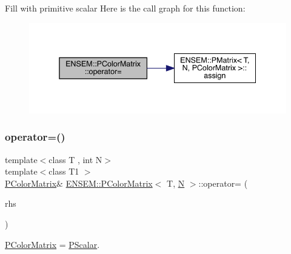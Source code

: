 Fill with primitive scalar Here is the call graph for this function\+:
\nopagebreak
\begin{figure}[H]
\begin{center}
\leavevmode
\includegraphics[width=338pt]{d8/d21/classENSEM_1_1PColorMatrix_a7750e72b224e47b6a559f3dc112b72d3_cgraph}
\end{center}
\end{figure}
\mbox{\label{classENSEM_1_1PColorMatrix_a7750e72b224e47b6a559f3dc112b72d3}} 
\subsubsection{\texorpdfstring{operator=()}{operator=()}\hspace{0.1cm}{\footnotesize\ttfamily [2/4]}}
{\footnotesize\ttfamily template$<$class T , int N$>$ \\
template$<$class T1 $>$ \\
\mbox{\hyperlink{classENSEM_1_1PColorMatrix}{P\+Color\+Matrix}}\& \mbox{\hyperlink{classENSEM_1_1PColorMatrix}{E\+N\+S\+E\+M\+::\+P\+Color\+Matrix}}$<$ T, \mbox{\hyperlink{operator__name__util_8cc_a7722c8ecbb62d99aee7ce68b1752f337}{N}} $>$\+::operator= (\begin{DoxyParamCaption}\item[{const \mbox{\hyperlink{classENSEM_1_1PScalar}{P\+Scalar}}$<$ T1 $>$ \&}]{rhs }\end{DoxyParamCaption})\hspace{0.3cm}{\ttfamily [inline]}}



\mbox{\hyperlink{classENSEM_1_1PColorMatrix}{P\+Color\+Matrix}} = \mbox{\hyperlink{classENSEM_1_1PScalar}{P\+Scalar}}. 

